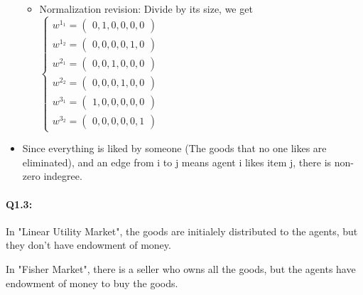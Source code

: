 \documentclass{article}
\newenvironment{answer}{\par\color{ForestGreen}}{\par}
\begin{document}
\begin{answer}
\begin{itemize}
\begin{itemize}
      \item Normalization revision: Divide by its size, we get
      $\begin{cases}
         w^{1_1} = \begin{pmatrix} 0, 1, 0, 0, 0, 0 \end{pmatrix} \\
         w^{1_2} = \begin{pmatrix} 0, 0, 0, 0, 1, 0 \end{pmatrix} \\
         w^{2_1} = \begin{pmatrix} 0, 0, 1, 0, 0, 0 \end{pmatrix} \\
         w^{2_2} = \begin{pmatrix} 0, 0, 0, 1, 0, 0 \end{pmatrix} \\
         w^{3_1} = \begin{pmatrix} 1, 0, 0, 0, 0, 0 \end{pmatrix} \\
         w^{3_2} = \begin{pmatrix} 0, 0, 0, 0, 0, 1 \end{pmatrix}
       \end{cases} $
    \end{itemize}


    \item Since everything is liked by someone (The goods that no one likes are eliminated), and an edge from i to j means agent i likes item j, there is non-zero indegree.
  \end{itemize}

  \paragraph{Q1.3:}
  \hfill \break
  In "Linear Utility Market", the goods are initialely distributed to the agents, but they don't have endowment of money.

  In "Fisher Market", there is a seller who owns all the goods, but the agents have endowment of money to buy the goods.
\end{answer}
\end{document}
